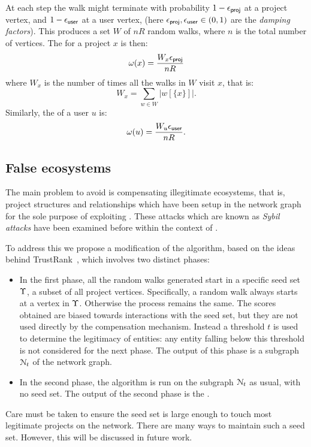 At each step the walk might terminate with probability $1 - \epsilon_{\mathsf{proj}}$ at a
project vertex, and $1 - \epsilon_{\mathsf{user}}$ at a user vertex, (here
$\epsilon_{\mathsf{proj}}, \epsilon_{\mathsf{user}} \in (0,1)$ are the \emph{damping factors}). This
produces a set $W$ of $nR$ random walks, where $n$ is the total number of
vertices. The \osrank{} for a project $x$ is then:
\[
  \omega(x) = \frac{W_x \epsilon_{\mathsf{proj}}}{n R}
\]
where $W_x$ is the number of times all the walks in $W$ visit $x$, that is:
\[
W_x = \sum_{w \in W} |w[\{x\}]|.
\]
Similarly, the \osrank{} of a user $u$ is:
\[
  \omega(u) = \frac{W_u \epsilon_{\mathsf{user}}}{n R}.
\]

\subsection{False ecosystems}

The main problem to avoid is compensating illegitimate ecosystems, that is,
project structures and relationships which have been setup in the
network graph for the sole purpose of exploiting \osrank{}.
These attacks which are known as \emph{Sybil attacks} have been examined
before \cite{pagerank-sybil} within the context of \pagerank{}.

To address this we propose a modification of the \pagerank{} algorithm, based
on the ideas behind TrustRank~\cite{trustrank}, which involves two distinct
phases:

\begin{itemize}
\item In the first phase, all the random walks generated start in a specific
  seed set $\Upsilon$, a subset of all project vertices. Specifically, a random
  walk always starts at a vertex in $\Upsilon$. Otherwise the process remains
  the same. The scores obtained are biased towards interactions with the seed
  set, but they are not used directly by the compensation mechanism. Instead a
  threshold $t$ is used to determine the legitimacy of entities: any entity
  falling below this threshold is not considered for the next phase. The output
  of this phase is a subgraph $\mathcal{N}_t$ of the network graph.
\item In the second phase, the algorithm is run on the subgraph
  $\mathcal{N}_t$ as usual, with no seed set. The output of the second
  phase is the \osrank{}.
\end{itemize}

Care must be taken to ensure the seed set is large enough to touch most
legitimate projects on the network.  There are many ways to maintain such a
seed set. However, this will be discussed in future work.

